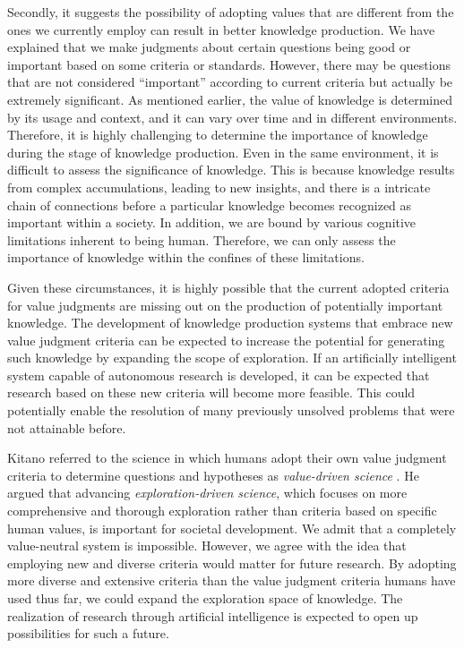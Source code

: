 \documentclass{book}
\begin{document}

Secondly, it suggests the possibility of adopting values that are different from the ones we currently employ can result in better knowledge production. We have explained that we make judgments about certain questions being good or important based on some criteria or standards. However, there may be questions that are not considered ``important'' according to current criteria but actually be extremely significant. As mentioned earlier, the value of knowledge is determined by its usage and context, and it can vary over time and in different environments. Therefore, it is highly challenging to determine the importance of knowledge during the stage of knowledge production. Even in the same environment, it is difficult to assess the significance of knowledge. This is because knowledge results from complex accumulations, leading to new insights, and there is a intricate chain of connections before a particular knowledge becomes recognized as important within a society. In addition, we are bound by various cognitive limitations inherent to being human. Therefore, we can only assess the importance of knowledge within the confines of these limitations. 

Given these circumstances, it is highly possible that the current adopted criteria for value judgments are missing out on the production of potentially important knowledge. The development of knowledge production systems that embrace new value judgment criteria can be expected to increase the potential for generating such knowledge by expanding the scope of exploration. If an artificially intelligent system capable of autonomous research is developed, it can be expected that research based on these new criteria will become more feasible. This could potentially enable the resolution of many previously unsolved problems that were not attainable before.

Kitano referred to the science in which humans adopt their own value judgment criteria to determine questions and hypotheses as \textit{value-driven science} \cite{kitano2021nobel}. He argued that advancing \textit{exploration-driven science}, which focuses on more comprehensive and thorough exploration rather than criteria based on specific human values, is important for societal development. We admit that a completely value-neutral system is impossible. However, we agree with the idea that employing new and diverse criteria would matter for future research. By adopting more diverse and extensive criteria than the value judgment criteria humans have used thus far, we could expand the exploration space of knowledge. The realization of research through artificial intelligence is expected to open up possibilities for such a future.
\end{document}
